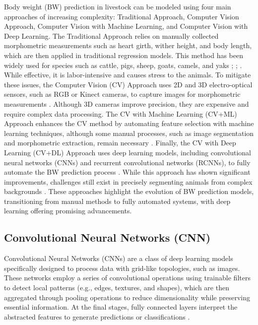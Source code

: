 {Body weight (BW) prediction in livestock can be modeled using four main approaches of increasing complexity: Traditional Approach, Computer Vision Approach, Computer Vision with Machine Learning, and Computer Vision with Deep Learning. The Traditional Approach relies on manually collected morphometric measurements such as heart girth, wither height, and body length, which are then applied in traditional regression models. This method has been widely used for species such as cattle, pigs, sheep, goats, camels, and yaks \citep{franco2017evaluation}; \citep{fadlelmoula2020prediction}; \citep{yan2019body}. While effective, it is labor-intensive and causes stress to the animals. To mitigate these issues, the Computer Vision (CV) Approach uses 2D and 3D electro-optical sensors, such as RGB or Kinect cameras, to capture images for morphometric measurements \citep{ozkaya2013prediction}. Although 3D cameras improve precision, they are expensive and require complex data processing. The CV with Machine Learning (CV+ML) Approach enhances the CV method by automating feature selection with machine learning techniques, although some manual processes, such as image segmentation and morphometric extraction, remain necessary \citep{tasdemir2019ann}. Finally, the CV with Deep Learning (CV+DL) Approach uses deep learning models, including convolutional neural networks (CNNs) and recurrent convolutional networks (RCNNs), to fully automate the BW prediction process \citep{gjergji2020deep}. While this approach has shown significant improvements, challenges still exist in precisely segmenting animals from complex backgrounds \citep{shukla2016metric}. These approaches highlight the evolution of BW prediction models, transitioning from manual methods to fully automated systems, with deep learning offering promising advancements.

\subsection{Convolutional Neural Networks (CNN)}

Convolutional Neural Networks (CNNs) are a class of deep learning models specifically designed to process data with grid-like topologies, such as images. These networks employ a series of convolutional operations using trainable filters to detect local patterns (e.g., edges, textures, and shapes), which are then aggregated through pooling operations to reduce dimensionality while preserving essential information. At the final stages, fully connected layers interpret the abstracted features to generate predictions or classifications \citep{lecun2015deep_learning}.

}
